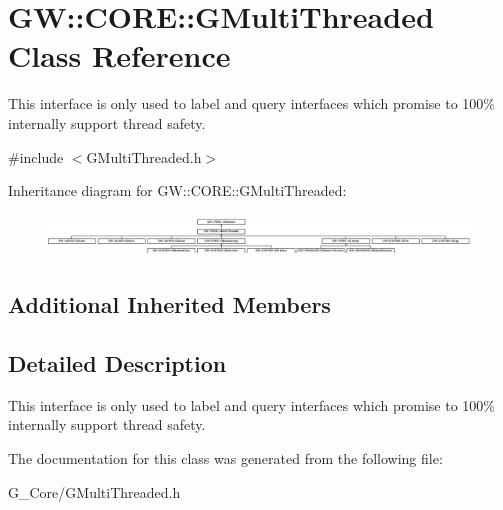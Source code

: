 \hypertarget{class_g_w_1_1_c_o_r_e_1_1_g_multi_threaded}{}\section{GW\+:\+:C\+O\+RE\+:\+:G\+Multi\+Threaded Class Reference}
\label{class_g_w_1_1_c_o_r_e_1_1_g_multi_threaded}


This interface is only used to label and query interfaces which promise to 100\% internally support thread safety.  




{\ttfamily \#include $<$G\+Multi\+Threaded.\+h$>$}

Inheritance diagram for GW\+:\+:C\+O\+RE\+:\+:G\+Multi\+Threaded\+:\begin{figure}[H]
\begin{center}
\leavevmode
\includegraphics[height=1.101278cm]{class_g_w_1_1_c_o_r_e_1_1_g_multi_threaded}
\end{center}
\end{figure}
\subsection*{Additional Inherited Members}


\subsection{Detailed Description}
This interface is only used to label and query interfaces which promise to 100\% internally support thread safety. 

The documentation for this class was generated from the following file\+:\begin{DoxyCompactItemize}
\item 
G\+\_\+\+Core/G\+Multi\+Threaded.\+h\end{DoxyCompactItemize}
